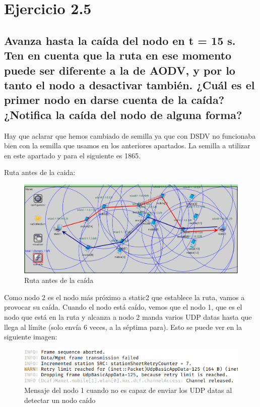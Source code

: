 \section{Ejercicio 2.5}

\subsection{Avanza hasta la caída del nodo en t = 15 s. Ten en cuenta que la ruta en ese momento puede ser diferente a
la de AODV, y por lo tanto el nodo a desactivar también. ¿Cuál es el primer nodo en darse cuenta de la caída?
¿Notifica la caída del nodo de alguna forma?}

Hay que aclarar que hemos cambiado de semilla ya que con DSDV no funcionaba bien con la semilla que usamos en los anteriores apartados. La semilla a utilizar en este apartado y para el siguiente es 1865.

Ruta antes de la caida:

\begin{figure}[H]
    \centering
    \includegraphics[width=115mm, scale=0.75]{imaxes/dsdv/ejercicio2_5.png}
    \caption{Ruta antes de la caída}
    \label{fig:ejer2_5_1}
\end{figure}


Como nodo 2 es el nodo más próximo a static2 que establece la ruta, vamos a provocar su caída. Cuando el nodo está caído, vemos que el nodo 1, que es el nodo que está en la ruta y alcanza a nodo 2 manda varios UDP datas hasta que llega al límite (solo envía 6 veces, a la séptima para). Esto se puede ver en la siguiente imagen:

\begin{figure}[H]
    \centering
    \includegraphics[width=115mm, scale=0.75]{imaxes/dsdv/ejercicio2_5_1.png}
    \caption{Mensaje del nodo 1 cuando no es capaz de enviar los UDP datas al detectar un nodo caído}
    \label{fig:ejer2_5_2}
\end{figure}


